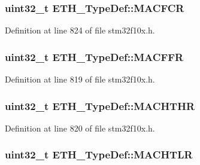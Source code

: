 \subsubsection[{\texorpdfstring{M\+A\+C\+F\+CR}{MACFCR}}]{ {\bf uint32\+\_\+t} E\+T\+H\+\_\+\+Type\+Def\+::\+M\+A\+C\+F\+CR}\hypertarget{struct_e_t_h___type_def_acdbe493d9d68ddfed4c758f0a7bde058}{}\label{struct_e_t_h___type_def_acdbe493d9d68ddfed4c758f0a7bde058}


Definition at line 824 of file stm32f10x.\+h.

\subsubsection[{\texorpdfstring{M\+A\+C\+F\+FR}{MACFFR}}]{ {\bf uint32\+\_\+t} E\+T\+H\+\_\+\+Type\+Def\+::\+M\+A\+C\+F\+FR}\hypertarget{struct_e_t_h___type_def_afdf573860dd5dcd13f2b6b19dcb92cc1}{}\label{struct_e_t_h___type_def_afdf573860dd5dcd13f2b6b19dcb92cc1}


Definition at line 819 of file stm32f10x.\+h.

\subsubsection[{\texorpdfstring{M\+A\+C\+H\+T\+HR}{MACHTHR}}]{ {\bf uint32\+\_\+t} E\+T\+H\+\_\+\+Type\+Def\+::\+M\+A\+C\+H\+T\+HR}\hypertarget{struct_e_t_h___type_def_ace541cc94118ec2db7c930a44960aa18}{}\label{struct_e_t_h___type_def_ace541cc94118ec2db7c930a44960aa18}


Definition at line 820 of file stm32f10x.\+h.

\subsubsection[{\texorpdfstring{M\+A\+C\+H\+T\+LR}{MACHTLR}}]{ {\bf uint32\+\_\+t} E\+T\+H\+\_\+\+Type\+Def\+::\+M\+A\+C\+H\+T\+LR}\hypertarget{struct_e_t_h___type_def_a22bd30c653a4c1c8f46a59e0a821dcf8}{}\label{struct_e_t_h___type_def_a22bd30c653a4c1c8f46a59e0a821dcf8}


